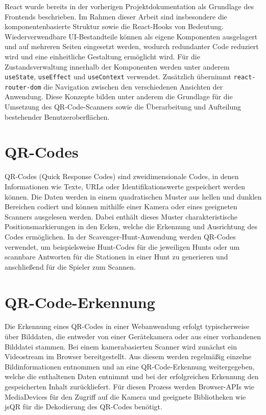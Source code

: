﻿\documentclass[oneside]{ausarbeitung}
\begin{document}
React wurde bereits in der vorherigen Projektdokumentation als Grundlage des Frontends beschrieben. Im Rahmen dieser Arbeit sind insbesondere die 
komponentenbasierte Struktur sowie die React-Hooks von Bedeutung. Wiederverwendbare UI-Bestandteile können als eigene Komponenten ausgelagert und auf 
mehreren Seiten eingesetzt werden, wodurch redundanter Code reduziert wird und eine einheitliche Gestaltung ermöglicht wird. Für die Zustandsverwaltung 
innerhalb der Komponenten werden unter anderem \texttt{useState}, \texttt{useEffect} und \texttt{useContext} verwendet. Zusätzlich übernimmt 
\texttt{react-router-dom} die Navigation zwischen den verschiedenen Ansichten der Anwendung. Diese Konzepte bilden unter anderem die Grundlage für die 
Umsetzung des QR-Code-Scanners sowie die Überarbeitung und Aufteilung bestehender Benutzeroberflächen.

\autocite{reactQuickStart,reactHooks}


\section{QR-Codes}
\label{sec:QR-Codes}

QR-Codes (Quick Response Codes) sind zweidimensionale Codes, in denen Informationen wie Texte, URLs oder Identifikationswerte gespeichert werden können.
Die Daten werden in einem quadratischen Muster aus hellen und dunklen Bereichen codiert und können mithilfe einer Kamera oder eines geeigneten Scanners 
ausgelesen werden. Dabei enthält dieses Muster charakteristische Positionsmarkierungen in den Ecken, welche die Erkennung und Ausrichtung des Codes 
ermöglichen. In der Scavenger-Hunt-Anwendung werden QR-Codes verwendet, um beispielsweise Hunt-Codes für die jeweiligen Hunts oder um scannbare 
Antworten für die Stationen in einer Hunt zu generieren und anschließend für die Spieler zum Scannen.

\autocite{densoQrCode}


\section{QR-Code-Erkennung}
\label{sec:qr-erkennung-web}

Die Erkennung eines QR-Codes in einer Webanwendung erfolgt typischerweise über Bilddaten, die entweder von einer Gerätekamera oder aus einer 
vorhandenen Bilddatei stammen. Bei einem kamerabasierten Scanner wird zunächst ein Videostream im Browser bereitgestellt. Aus diesem werden regelmäßig 
einzelne Bildinformationen entnommen und an eine QR-Code-Erkennung weitergegeben, welche die enthaltenen Daten entnimmt und bei der erfolgreichen 
Erkennung den gespeicherten Inhalt zurückliefert. Für diesen Prozess werden Browser-APIs wie MediaDevices für den Zugriff auf die Kamera und geeignete 
Bibliotheken wie jsQR für die Dekodierung des QR-Codes benötigt.
\end{document}
